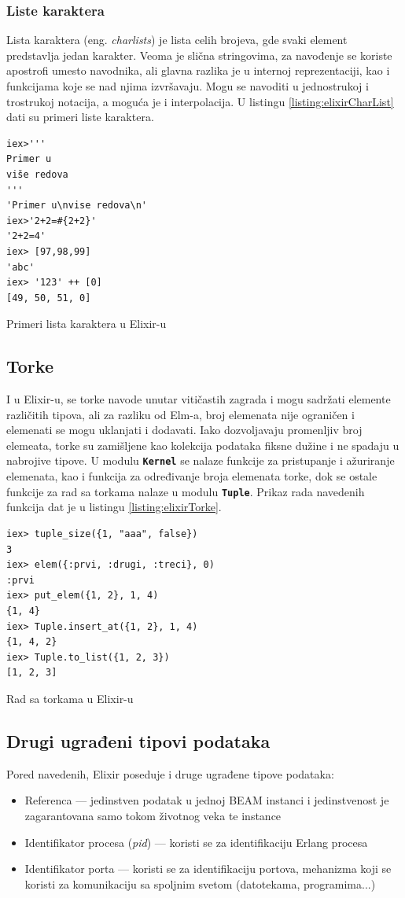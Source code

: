\documentclass[12pt,oneside]{memoir}
\begin{document}
\subsubsection{Liste karaktera }
Lista karaktera (eng. \emph{charlists}) je lista celih brojeva, gde svaki element predstavlja jedan karakter.
Veoma je slična stringovima, za navođenje se koriste apostrofi umesto navodnika, 
ali glavna razlika je u internoj reprezentaciji, kao i funkcijama koje se nad njima
izvršavaju. Mogu se navoditi u jednostrukoj i trostrukoj notacija, a moguća je i 
interpolacija. U listingu \ref{listing:elixirCharList} dati su primeri liste karaktera.
\begin{listing}[h]
\begin{verbatim}
iex>'''
Primer u
više redova
'''
'Primer u\nvise redova\n'
iex>'2+2=#{2+2}'
'2+2=4'
iex> [97,98,99]
'abc'
iex> '123' ++ [0] 
[49, 50, 51, 0]
\end{verbatim}
\caption{Primeri lista karaktera u Elixir-u}
\label{listing:elixirCharList}
\end{listing}

\subsection{Torke}
I u Elixir-u, se torke navode unutar vitičastih zagrada i mogu sadržati elemente različitih
tipova, ali za razliku od Elm-a, broj elemenata nije ograničen i elemenati se mogu uklanjati
i dodavati. Iako dozvoljavaju promenljiv broj elemeata, torke su zamišljene kao kolekcija
podataka fiksne dužine i ne spadaju u nabrojive tipove. U modulu \texttt{\textbf{Kernel}}
se nalaze funkcije za pristupanje i ažuriranje elemenata, kao i funkcija za određivanje broja
elemenata torke, dok se ostale funkcije za rad sa torkama nalaze u modulu \texttt{\textbf{Tuple}}.
Prikaz rada navedenih funkcija dat je u listingu \ref{listing:elixirTorke}.
\begin{listing}[!h]
\begin{verbatim}
iex> tuple_size({1, "aaa", false})
3
iex> elem({:prvi, :drugi, :treci}, 0)
:prvi
iex> put_elem({1, 2}, 1, 4)
{1, 4}
iex> Tuple.insert_at({1, 2}, 1, 4)
{1, 4, 2}
iex> Tuple.to_list({1, 2, 3})
[1, 2, 3]
\end{verbatim}
\caption{Rad sa torkama u Elixir-u}
\label{listing:elixirTorke}
\end{listing}
\subsection{Drugi ugrađeni tipovi podataka}
Pored navedenih, Elixir poseduje i druge ugrađene tipove podataka:
\begin{itemize}
  \item Referenca --- jedinstven podatak u jednoj BEAM instanci i jedinstvenost je
  zagarantovana samo tokom životnog veka te instance
  \item Identifikator procesa (\emph{pid}) --- koristi se za identifikaciju Erlang procesa
  \item Identifikator porta --- koristi se za identifikaciju portova, mehanizma koji se
  koristi za komunikaciju sa spoljnim svetom (datotekama, programima...)
\end{itemize} 
\end{document}
